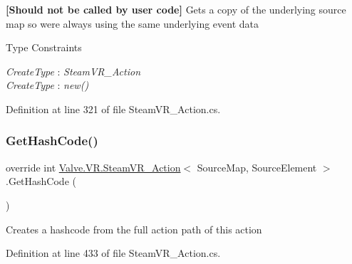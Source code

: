 {\bfseries{\mbox{[}Should not be called by user code\mbox{]}}} Gets a copy of the underlying source map so we\textquotesingle{}re always using the same underlying event data 

\begin{Desc}
\item[Type Constraints]\begin{description}
\item[{\em Create\+Type} : {\em Steam\+V\+R\+\_\+\+Action}]\item[{\em Create\+Type} : {\em new()}]\end{description}
\end{Desc}


Definition at line 321 of file Steam\+V\+R\+\_\+\+Action.\+cs.

\mbox{\label{class_valve_1_1_v_r_1_1_steam_v_r___action_ae10204d3c1c0f5e01fee7e22c8d56a15}} 
\subsubsection{\texorpdfstring{GetHashCode()}{GetHashCode()}}
{\footnotesize\ttfamily override int \mbox{\hyperlink{class_valve_1_1_v_r_1_1_steam_v_r___action}{Valve.\+V\+R.\+Steam\+V\+R\+\_\+\+Action}}$<$ Source\+Map, Source\+Element $>$.Get\+Hash\+Code (\begin{DoxyParamCaption}{ }\end{DoxyParamCaption})}



Creates a hashcode from the full action path of this action 



Definition at line 433 of file Steam\+V\+R\+\_\+\+Action.\+cs.

\mbox{\label{class_valve_1_1_v_r_1_1_steam_v_r___action_a24bb49705ffd97a432add0cb2233ff91}} 
